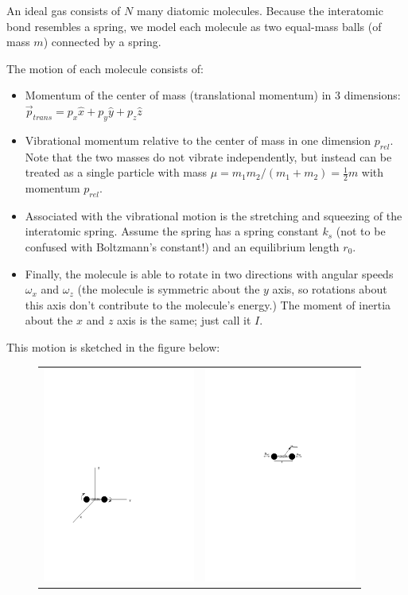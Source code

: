 
\question An ideal gas consists of $N$ many diatomic molecules. Because the interatomic bond resembles a spring, we model each molecule as two equal-mass balls (of mass $m$) connected by a spring.

The motion of each molecule consists of:
\begin{itemize}
	\item Momentum of the center of mass (translational momentum) in 3 dimensions: $\vec{p}_{trans}=p_x\hat{x}+p_y\hat{y}+p_z\hat{z}$
	\item Vibrational momentum relative to the center of mass in one dimension $p_{rel}$. Note that the two masses do not vibrate independently, but instead can be treated as a single particle with mass $\mu=m_1m_2/(m_1+m_2)=\frac{1}{2}m$ with momentum $p_{rel}$.
	\item Associated with the vibrational motion is the stretching and squeezing of the interatomic spring. Assume the spring has a spring constant $k_s$ (not to be confused with Boltzmann's constant!) and an equilibrium length $r_0$.
	\item Finally, the molecule is able to rotate in two directions with angular speeds $\omega_x$ and $\omega_z$ (the molecule is symmetric about the $y$ axis, so rotations about this axis don't contribute to the molecule's energy.) The moment of inertia about the $x$ and $z$ axis is the same; just call it $I$.
\end{itemize}
This motion is sketched in the figure below:
\begin{figure}[ht!]
	\centering
\begin{tabular}{cc}
	\includegraphics[width=5cm]{diatomic1} & \includegraphics[width=5cm]{diatomic2}
\end{tabular}
\end{figure}

